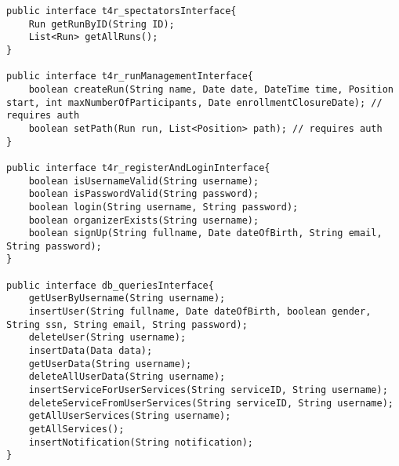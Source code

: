 \documentclass[../../DD.tex]{subfiles}
\begin{document}
\begin{lstlisting}
public interface t4r_spectatorsInterface{
	Run getRunByID(String ID);
	List<Run> getAllRuns();
}

public interface t4r_runManagementInterface{
	boolean createRun(String name, Date date, DateTime time, Position start, int maxNumberOfParticipants, Date enrollmentClosureDate); // requires auth
	boolean setPath(Run run, List<Position> path); // requires auth
}

public interface t4r_registerAndLoginInterface{
	boolean isUsernameValid(String username);
	boolean isPasswordValid(String password);
	boolean login(String username, String password);
	boolean organizerExists(String username);
	boolean signUp(String fullname, Date dateOfBirth, String email, String password);
}

public interface db_queriesInterface{
	getUserByUsername(String username);
	insertUser(String fullname, Date dateOfBirth, boolean gender, String ssn, String email, String password);
	deleteUser(String username);
	insertData(Data data);
	getUserData(String username);
	deleteAllUserData(String username);
	insertServiceForUserServices(String serviceID, String username);
	deleteServiceFromUserServices(String serviceID, String username);
	getAllUserServices(String username);
	getAllServices();
	insertNotification(String notification);
}
\end{lstlisting}
\end{document}
